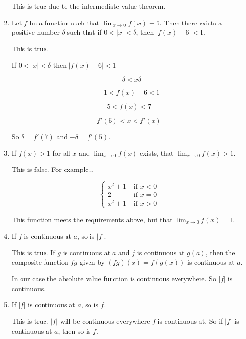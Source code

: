 \documentclass{article}
\begin{document}
\begin{enumerate}
		This is true due to the intermediate value theorem.

	\item Let $f$ be a function such that $\lim _{x \to 0} f(x) = 6$. Then there exists
		a positive number $\delta$ such that if $0 < |x| < \delta$, then $|f(x) - 6| < 1$.

		This is true. 

		If $0 < |x| < \delta$ then $|f(x) - 6| < 1$

		$$-\delta < x \delta$$

		$$-1 < f(x) - 6 < 1$$

		$$5 < f(x) < 7$$

		$$f'(5) < x < f'(x)$$

		So $\delta = f'(7)$ and $-\delta = f'(5)$.

	\item If $f(x) > 1$ for all $x$ and $\lim _{x \to 0} f(x)$ exists, that $\lim _{x \to 0} f(x) > 1$.

		This is false. For example...

		$$ \begin{cases}
			x^2 + 1 & \text{ if } x < 0 \\
			2 & \text{ if } x = 0 \\
			x^2 + 1 & \text{ if } x > 0
		\end{cases}$$

		This function meets the requirements above, but that $\lim _{x \to 0} f(x) = 1$.

	\item If $f$ is continuous at $a$, so is $|f|$.

		This is true. If $g$ is continuous at $a$ and $f$ is continuous at $g(a)$, then
		the composite function $f \dot g$ given by $(f \dot g)(x) = f(g(x))$ is continuous
		at $a$.

		In our case the absolute value function is continuous everywhere. So $|f|$ is continuous.

	\item If $|f|$ is continuous at $a$, so is $f$.

		This is true. $|f|$ will be continuous everywhere $f$ is continuous at. So if
		$|f|$ is continuous at $a$, then so is $f$.
\end{enumerate}
\end{document}
